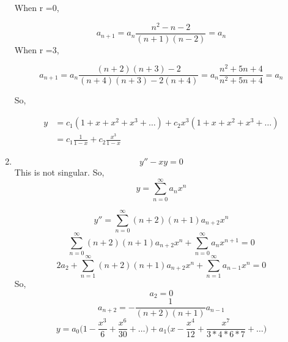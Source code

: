 \documentclass[letterpaper,12pt]{article}
\begin{document}
\begin{enumerate}
When r =0,

\[ a_{n+1} = a_n \frac{n^2-n -2}{(n+1)(n-2)}=  a_n\]
When r =3,

\[ a_{n+1} = a_n \frac{(n+2)(n+3) -2}{(n+4)(n+3) - 2 (n+4)} = a_n \frac{n^2+5n+4}{n^2+5n+4}= a_n \]

So,

\begin{align*}
y &= c_1 (1+ x+x^2+x^3 +\hdots) + c_2 x^3 (1+ x+x^2+x^3 +\hdots)\\
&= c_1 \frac{1}{1-x} + c_2 \frac{x^3}{1-x}
\end{align*}

\item
\[y'' - xy = 0\]
This is not singular. So,
\[y = \sum_{n=0}^\infty a_n x^n \]

\[y''= \sum_{n=0}^\infty (n+2)(n+1) a_{n+2} x^{n} \]
\[\sum_{n=0}^\infty (n+2)(n+1) a_{n+2} x^{n} + \sum_{n=0}^\infty a_n x^{n+1} =0 \]
\[2a_2 + \sum_{n=1}^\infty (n+2)(n+1) a_{n+2} x^{n} + \sum_{n=1}^\infty a_{n-1} x^{n} =0 \]
So,
\[a_2 = 0\]
\[a_{n+2} = -\frac{1}{(n+2)(n+1)}a_{n-1}\]
\[y = a_0\big(1 -  \frac{x^3}{6} +  \frac{x^6}{30} + \ldots \big) +a_1\big(x - \frac{x^4}{12}+ \frac{x^7}{3*4*6*7} + \ldots \big)\]
\end{enumerate}
\end{document}
